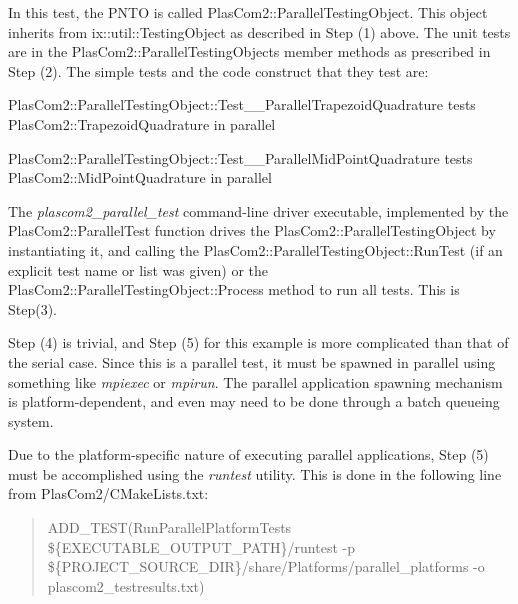 In this test, the P\+N\+TO is called Plas\+Com2\+::\+Parallel\+Testing\+Object. This object inherits from ix\+::util\+::\+Testing\+Object as described in Step (1) above. The unit tests are in the Plas\+Com2\+::\+Parallel\+Testing\+Object\textquotesingle{}s member methods as prescribed in Step (2). The simple tests and the code construct that they test are\+:
\begin{DoxyItemize}
\item Plas\+Com2\+::\+Parallel\+Testing\+Object\+::\+Test\+\_\+\+\_\+\+Parallel\+Trapezoid\+Quadrature tests Plas\+Com2\+::\+Trapezoid\+Quadrature in parallel
\item Plas\+Com2\+::\+Parallel\+Testing\+Object\+::\+Test\+\_\+\+\_\+\+Parallel\+Mid\+Point\+Quadrature tests Plas\+Com2\+::\+Mid\+Point\+Quadrature in parallel
\end{DoxyItemize}

The {\itshape plascom2\+\_\+parallel\+\_\+test} command-\/line driver executable, implemented by the Plas\+Com2\+::\+Parallel\+Test function drives the Plas\+Com2\+::\+Parallel\+Testing\+Object by instantiating it, and calling the Plas\+Com2\+::\+Parallel\+Testing\+Object\+::\+Run\+Test (if an explicit test name or list was given) or the Plas\+Com2\+::\+Parallel\+Testing\+Object\+::\+Process method to run all tests. This is Step(3).

Step (4) is trivial, and Step (5) for this example is more complicated than that of the serial case. Since this is a parallel test, it must be spawned in parallel using something like {\itshape mpiexec} or {\itshape mpirun}. The parallel application spawning mechanism is platform-\/dependent, and even may need to be done through a batch queueing system.

Due to the platform-\/specific nature of executing parallel applications, Step (5) must be accomplished using the {\itshape runtest} utility. This is done in the following line from {\ttfamily Plas\+Com2/\+C\+Make\+Lists.\+txt}\+:

\begin{quote}
A\+D\+D\+\_\+\+T\+E\+ST(Run\+Parallel\+Platform\+Tests \$\{E\+X\+E\+C\+U\+T\+A\+B\+L\+E\+\_\+\+O\+U\+T\+P\+U\+T\+\_\+\+P\+A\+TH\}/runtest -\/p \$\{P\+R\+O\+J\+E\+C\+T\+\_\+\+S\+O\+U\+R\+C\+E\+\_\+\+D\+IR\}/share/\+Platforms/parallel\+\_\+platforms -\/o plascom2\+\_\+testresults.\+txt) \end{quote}


